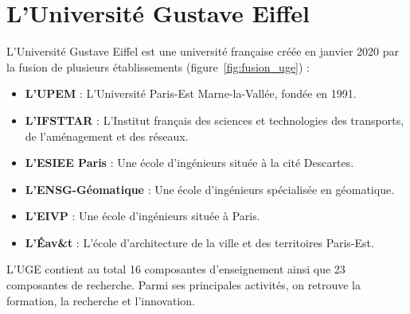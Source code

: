 \documentclass[12pt,a4paper,oneside]{report}
\begin{document}
\section{L'Université Gustave Eiffel}

L'Université Gustave Eiffel est une université française créée en janvier 2020
 par la fusion de plusieurs établissements (figure~\ref{fig:fusion_uge}) :

\begin{itemize}
    \item \textbf{L'UPEM} : L'Université Paris-Est Marne-la-Vallée, fondée en 1991.
    \item \textbf{L'IFSTTAR} : L'Institut français des sciences et technologies des transports, de l'aménagement et des réseaux.
    \item \textbf{L'ESIEE Paris} : Une école d'ingénieurs située à la cité Descartes.
    \item \textbf{L'ENSG-Géomatique} : Une école d'ingénieurs spécialisée en géomatique.
    \item \textbf{L'EIVP} : Une école d'ingénieurs située à Paris.
    \item \textbf{L'Éav\&t} : L'école d'architecture de la ville et des territoires Paris-Est.
\end{itemize}

L'UGE contient au total 16 composantes d'enseignement ainsi que 23 composantes
 de recherche. Parmi ses principales activités, on retrouve la formation, 
 la recherche et l'innovation.
\end{document}
